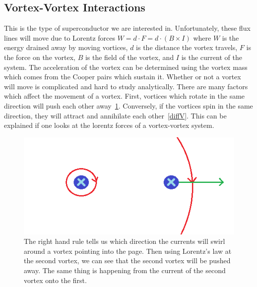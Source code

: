 \subsection{Vortex-Vortex Interactions}
	This is the type of superconductor we are interested in. Unfortunately, these flux lines will move due to Lorentz forces $W = d \cdot F = d \cdot (B \times I)$ where $W$ is the energy drained away by moving vortices, $d$ is the distance the vortex travels, $F$ is the force on the vortex, $B$ is the field of the vortex, and $I$ is the current of the system. The acceleration of the vortex can be determined using the vortex mass which comes from the Cooper pairs which sustain it. Whether or not a vortex will move is complicated and hard to study analytically. There are many factors which affect the movement of a vortex. First, vortices which rotate in the same direction will push each other away~\ref{sameV}. Conversely, if the vortices spin in the same direction, they will attract and annihilate each other~\ref{diffV}. This can be explained if one looks at the lorentz forces of a vortex-vortex system.

\begin{figure}[htbp]
\begin{center}
\includegraphics[scale=.50]{sameVortex.png}
\caption{The right hand rule tells us which direction the currents will swirl around a vortex pointing into the page. Then using Lorentz's law  at the second vortex, we can see that the second vortex will be pushed away. The same thing is happening from the current of the second vortex onto the first.}
\label{sameV}
\end{center}
\end{figure}

